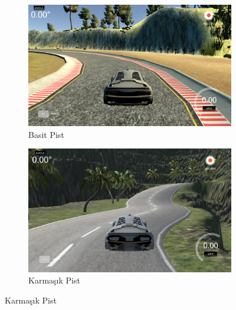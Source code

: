\documentclass{article}
\begin{document}
\begin{figure}[h]
    \centering
    \begin{subfigure}{0.5\textwidth}
        \centering
        \includegraphics[width=1.1\linewidth]{image/Resim61.PNG}
        \caption{Basit Pist}
        \label{fig:resim1}
    \end{subfigure}%
    \begin{subfigure}{0.5\textwidth}
        \centering
        \includegraphics[width=1.1\linewidth]{image/Resim62.PNG}
        \caption{Karmaşık Pist}
        \label{fig:resim2}
    \end{subfigure}
    \label{fig:iki_resim}
\end{figure}
\newpage
\end{document}
